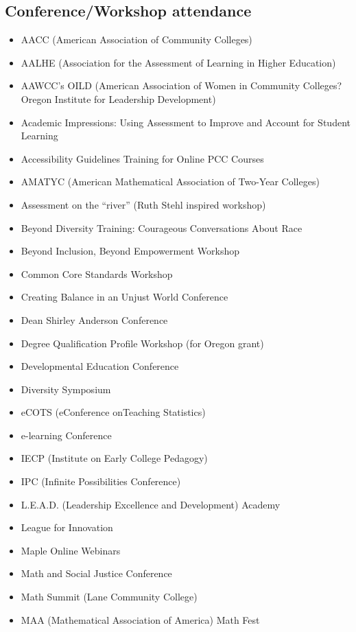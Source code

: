 \begin{widepage}
\begin{multicols*}{2}
\section*{Conference/Workshop attendance}

\begin{itemize}[label={}]
\item AACC (American Association of Community Colleges)
\item AALHE (Association for the Assessment of Learning in Higher Education)
\item AAWCC's OILD (American Association of Women in Community Colleges? Oregon Institute for Leadership Development)
\item Academic Impressions: Using Assessment to Improve and Account for Student Learning
\item Accessibility Guidelines Training for Online PCC Courses
\item AMATYC (American Mathematical Association of Two-Year Colleges)
\item Assessment on the ``river'' (Ruth Stehl inspired workshop)
\item Beyond Diversity Training: Courageous Conversations About Race
\item Beyond Inclusion, Beyond Empowerment Workshop
\item Common Core Standards Workshop
\item Creating Balance in an Unjust World Conference
\item Dean Shirley Anderson Conference
\item Degree Qualification Profile Workshop (for Oregon grant)
\item Developmental Education Conference
\item Diversity Symposium
\item eCOTS  (eConference onTeaching Statistics)
\item e-learning Conference
\item IECP (Institute on Early College Pedagogy)
\item IPC (Infinite Possibilities Conference)
\item L.E.A.D. (Leadership Excellence and Development) Academy
\item League for Innovation
\item Maple Online Webinars
\item Math and Social Justice Conference
\item Math Summit (Lane Community College)
\item MAA (Mathematical Association of America) Math Fest

\end{itemize}
\end{multicols*}
\end{widepage}
